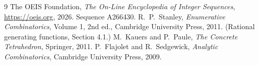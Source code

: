 \documentclass[11pt,a4paper]{article}
\theoremstyle{plain}
\theoremstyle{definition}
\begin{document}
\begin{thebibliography}{9}
 The OEIS Foundation, \emph{The On-Line Encyclopedia of Integer
Sequences}, \url{https://oeis.org}, 2026. Sequence A266430.
 R.~P.~Stanley, \emph{Enumerative Combinatorics}, Volume 1, 2nd ed.,
Cambridge University Press, 2011. (Rational generating functions, Section 4.1.)
 M.~Kauers and P.~Paule, \emph{The Concrete Tetrahedron}, Springer, 2011.
 P.~Flajolet and R.~Sedgewick, \emph{Analytic Combinatorics}, Cambridge
University Press, 2009.
\end{thebibliography}
\end{document}

